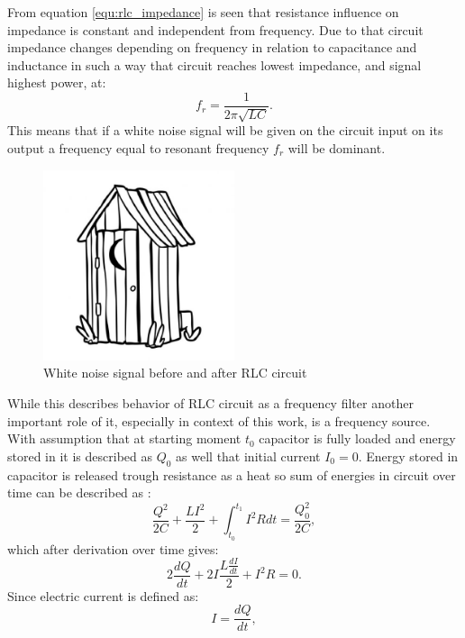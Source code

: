From equation \ref{equ:rlc_impedance} is seen that resistance influence on impedance is 
constant and independent from frequency. Due to that circuit impedance changes depending on
frequency in relation to capacitance and inductance in such a way that circuit reaches lowest
impedance, and signal highest power, at:
\begin{equation}
	\label{fig:rlc_resonance}
	f_{r} = \frac{1}{2\pi \sqrt{LC}}.
\end{equation}
This means that if a white noise signal will be given on the circuit input on its output 
a frequency equal to resonant frequency $f_{r}$ will be dominant.
\begin{figure}[htb] 
	\label{fig:white_rlc_filter}
	\centering
	\includegraphics[width=0.5\textwidth]{figures/wychodek}
	\caption{White noise signal before and after RLC circuit}
\end{figure}
While this describes behavior of RLC circuit as a frequency filter another important role of it,
especially in context of this work, is a frequency source.
With assumption that at starting moment $t_{0}$ capacitor is fully loaded and energy stored
in it is described as $Q_{0}$ as well that initial current $I_{0}=0$.
Energy stored in capacitor is released trough resistance as a heat so sum of energies in 
circuit over time can be described as :
\begin{equation}
	\label{equ:circuit_energy}
	\frac{Q^{2}}{2C}+\frac{LI^{2}}{2}+\int_{t_{0}}^{t_{1}}I^{2}R dt = \frac{Q_{0}^{2}}{2C},
\end{equation}
which after derivation over time gives:
\begin{equation}
	\label{equ:circuit_energy_der}
	2\frac{dQ}{dt} + 2I \frac{L\frac{dI}{dt} }{2} + I^{2}R = 0.
\end{equation}
Since electric current is defined as:
\begin{equation}
	\label{equ:current_as_power}
	I = \frac{dQ}{dt},
\end{equation}

